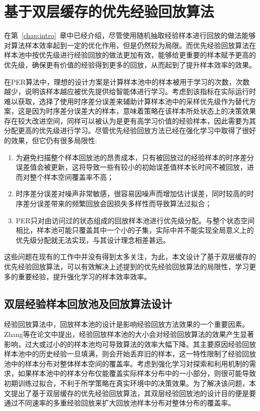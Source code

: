 
\chapter{基于双层缓存的优先经验回放算法}\label{chap:dper}

在第~\ref{chap:intro}~章中已经介绍，尽管使用随机抽取经验样本进行回放的做法能够对算法样本效率起到一定的优化作用，但是仍然较为局限。而优先经验回放算法在样本池中按优先级进行经验回放的做法更加有效，能够给更重要的样本赋予更高的优先级，确保更有价值的经验得到更多的回放，从而起到了提升样本效率的效果。

在PER算法中，理想的设计方案是计算样本池中的样本被用于学习的次数，次数越少，说明该样本越应被优先提供给智能体进行学习。考虑到该指标在实际运行时难以获取，选择了使用时序差分误差来辅助计算样本池中的采样优先级作为替代方案，这是因为时序差分误差大的样本，意味着策略在该样本所处状态上的决策效果存在较大改进空间，同样可以被认为是更有高学习价值的经验样本，因此需要为其分配更高的优先级进行学习。尽管优先经验回放方法已经在强化学习中取得了很好的效果，但它仍有很多局限性:

\begin{enumerate}[1)]
    \item 为避免扫描整个样本回放池的昂贵成本，只有被回放过的经验样本的时序差分误差值会被更新，这将导致一些有较小的初始误差值样本长时间不被回放，进而对整个样本空间覆盖率不高；
    \item 时序差分误差对噪声非常敏感，很容易因噪声而增加估计误差，同时较高的时序差分误差带来的频繁回放会因损失多样性而导致算法过拟合；
    \item PER只对由访问过的状态组成的回放样本池进行优先级分配。与整个状态空间相比，样本池可能只覆盖其中一个小的子集，实际中并不能实现全局意义上的优先级分配就无法实现，与其设计理念相差甚远。
\end{enumerate}

这些问题在现有的工作中并没有得到太多关注，为此，本文设计了基于双层缓存的优先经验回放算法，可以有效解决上述提到的优先经验回放算法的局限性，学习更多的重要经验，提升强化学习的样本效率效率。

\section{双层经验样本回放池及回放算法设计}

经验回放算法中，回放样本池的设计是影响经验回放方法效果的一个重要因素。Zhang等\cite{zhang2017deeper}在论文中提出，经验回放样本池的大小会对经验回放算法的效果产生显著影响，过大或过小的的样本池均可导致算法的效率大幅下降。其主要原因经验回放样本池中的历史经验一旦填满，则会开始丢弃旧的样本，这一特性限制了经验回放池中的样本分布对整体样本空间的覆盖率。考虑到强化学习对探索和利用机制的需求，如果样本池中的样本分布仅能覆盖实际样本分布中的一小部分，则很可能导致初期训练过拟合，不利于所学策略在真实环境中的决策效果。为了解决该问题，本文提出了基于双层缓存的优先经验回放算法，其双层经验回放池的设计目的便是要通过不同速率的多重经验回放来扩大回放池样本分布对整体分布的覆盖率。

